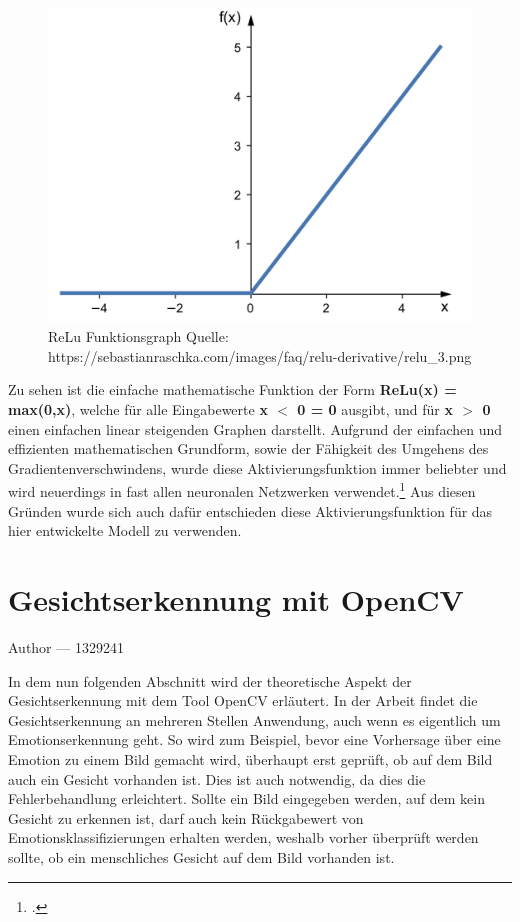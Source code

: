 \documentclass[12pt, a4paper]{report}
\makeatletter
\newcommand{\sectionauthor}[1]{%
  {\parindent0pt\vspace*{-5pt}%
  \large{Author --- }
  \linespread{1.1}\large\scshape#1%
  \par\nobreak\vspace*{35pt} }
  \@afterheading%
}
\makeatother
\begin{document}
\begin{figure}[H]
\includegraphics[width=\linewidth]{Bilder/relu.png}
\caption{ReLu Funktionsgraph \newline Quelle: https://sebastianraschka.com/images/faq/relu-derivative/relu\_3.png}
\label{fig: ReLu}
\end{figure}
Zu sehen ist die einfache mathematische Funktion der Form \textbf{ReLu(x) = max(0,x)}, welche für alle Eingabewerte \textbf{x $<$ 0 = 0} ausgibt, und für \textbf{x $>$ 0} einen einfachen linear steigenden Graphen darstellt. Aufgrund der einfachen und effizienten mathematischen Grundform, sowie der Fähigkeit des Umgehens des Gradientenverschwindens, wurde diese Aktivierungsfunktion immer beliebter und wird neuerdings in fast allen neuronalen Netzwerken verwendet.\footcite[Vgl.][]{Aktivierungsfunktion2}
\newline
Aus diesen Gründen wurde sich auch dafür entschieden diese Aktivierungsfunktion für das hier entwickelte Modell zu verwenden.

\section{Gesichtserkennung mit OpenCV}
\sectionauthor{1329241}
In dem nun folgenden Abschnitt wird der theoretische Aspekt der Gesichtserkennung mit dem Tool OpenCV erläutert. In der Arbeit findet die Gesichtserkennung an mehreren Stellen Anwendung, auch wenn es eigentlich um Emotionserkennung geht. So wird zum Beispiel, bevor eine Vorhersage über eine Emotion zu einem Bild gemacht wird, überhaupt erst geprüft, ob auf dem Bild auch ein Gesicht vorhanden ist. Dies ist auch notwendig, da dies die Fehlerbehandlung erleichtert. Sollte ein Bild eingegeben werden, auf dem kein Gesicht zu erkennen ist, darf auch kein Rückgabewert von Emotionsklassifizierungen erhalten werden, weshalb vorher überprüft werden sollte, ob ein menschliches Gesicht auf dem Bild vorhanden ist.
\end{document}
